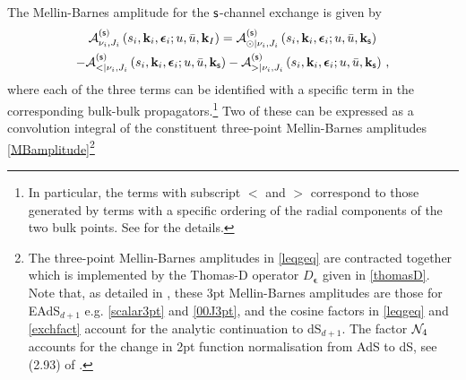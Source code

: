 \documentclass[11pt,a4paper]{article}
\begin{document}
The Mellin-Barnes amplitude for the ${\sf s}$-channel exchange is given by
\begin{multline}  {\cal A}^{\left({\sf s}\right)}_{\nu_i,J_i}\left(s_i,{\bf k}_i,\boldsymbol{\epsilon}_i;u,{\bar u},{\bf k}_I\right) ={\cal A}^{\left({\sf s}\right)}_{\odot|\nu_i,J_i}\left(s_i,{\bf k}_i,\boldsymbol{\epsilon}_i;u,{\bar u},{\bf k}_{\sf s}\right)\\-{\cal A}^{\left({\sf s}\right)}_{<|\nu_i,J_i}\left(s_i,{\bf k}_i,\boldsymbol{\epsilon}_i;u,{\bar u},{\bf k}_{\sf s}\right)-{\cal A}^{\left({\sf s}\right)}_{>|\nu_i,J_i}\left(s_i,{\bf k}_i,\boldsymbol{\epsilon}_i;u,{\bar u},{\bf k}_{\sf s}\right)\,, \label{MBexch}
\end{multline}
where each of the three terms can be identified with a specific term in the corresponding bulk-bulk propagators.\footnote{In particular, the terms with subscript $<$ and $>$ correspond to those generated by terms with a specific ordering of the radial components of the two bulk points. See \cite{Sleight:2019hfp} for the details.} Two of these can be expressed as a convolution integral of the constituent three-point Mellin-Barnes amplitudes \eqref{MBamplitude}\footnote{The three-point Mellin-Barnes amplitudes in \eqref{leqgeq} are contracted together which is implemented by the Thomas-D operator $D_{\boldsymbol{\epsilon}}$ given in \eqref{thomasD}. Note that, as detailed in \cite{Sleight:2019hfp}, these 3pt Mellin-Barnes amplitudes are those for EAdS$_{d+1}$ e.g. \eqref{scalar3pt} and \eqref{00J3pt}, and the cosine factors in \eqref{leqgeq} and \eqref{exchfact} account for the analytic continuation to dS$_{d+1}$. The factor ${\cal N}_4$ accounts for the change in 2pt function normalisation from AdS to dS, see (2.93) of \cite{Sleight:2019hfp}.} 
\end{document}
